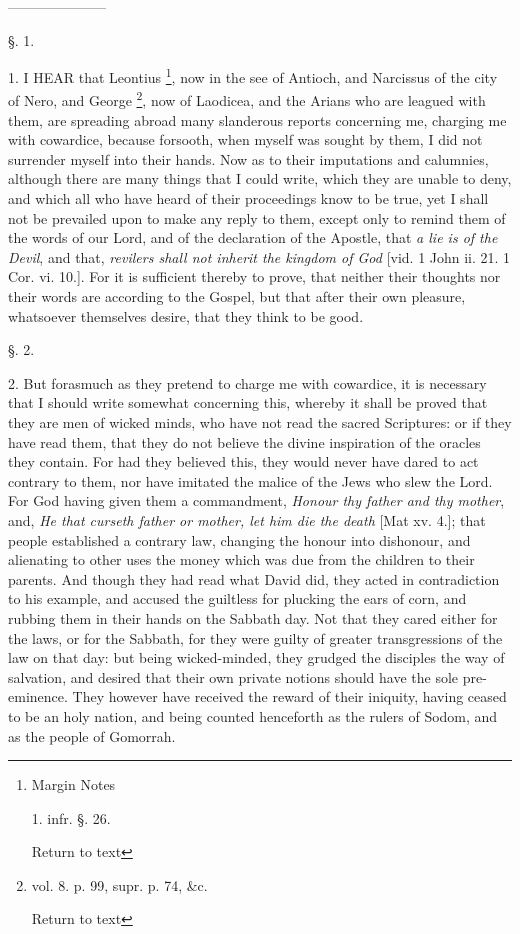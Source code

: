 ———————

§. 1.

1. I HEAR that Leontius \footnote{Margin Notes

1. infr. §. 26.

Return to text}, now in the see of Antioch, and Narcissus of the city of
Nero, and George \footnote{vol. 8. p. 99, supr. p. 74, \&c.

Return to text}, now
of Laodicea, and the Arians who are leagued with them, are spreading
abroad many slanderous reports concerning me, charging me with
cowardice, because forsooth, when myself was sought by them, I did not
surrender myself into their hands. Now as to their imputations and
calumnies, although there are many things that I could write, which
they are unable to deny, and which all who have heard of their
proceedings know to be true, yet I shall not be prevailed upon to make
any reply to them, except only to remind them of the words of our
Lord, and of the declaration of the Apostle, that \emph{a lie is of the
Devil}, and that, \emph{revilers shall not inherit the kingdom of God}
[vid. 1 John ii. 21. 1 Cor. vi. 10.]. For it is sufficient thereby to
prove, that neither their thoughts nor their words are according to
the Gospel, but that after their own pleasure, whatsoever themselves
desire, that they think to be good.

§. 2.

2. But forasmuch as they pretend to charge me
with cowardice, it is necessary that I should write somewhat
concerning this, whereby it shall be proved that they are men of
wicked minds, who have not read the sacred Scriptures: or if they have
read them, that they do not believe the divine inspiration of the
oracles they contain. For had they believed this, they would never
have dared to act contrary to them, nor have imitated the malice of
the Jews who slew the Lord. For God having given them a commandment, \emph{Honour
thy father and thy mother}, and, \emph{He that curseth father or
mother, let him die the death} [Mat xv. 4.]; that people
established a contrary law, changing the honour into dishonour, and
alienating to other uses the money which was due from the children to
their parents. And though they had read what David did, they acted in
contradiction to his example, and accused the guiltless for plucking
the ears of corn, and rubbing them in their hands on the Sabbath day.
Not that they cared either for the laws, or for the Sabbath, for they
were guilty of greater transgressions of the law on that day: but
being wicked-minded, they grudged the disciples the way of salvation,
and desired that their own private notions should have the sole
pre-eminence. They however have received the reward of their iniquity,
having ceased to be an holy nation, and being counted henceforth as
the rulers of Sodom, and as the people of Gomorrah.

